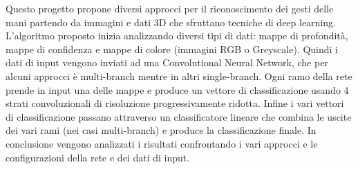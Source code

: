 
Questo progetto propone diversi approcci per il riconoscimento dei gesti delle mani partendo da immagini e dati 3D che sfruttano tecniche di deep learning. L'algoritmo proposto inizia analizzando diversi tipi di dati: mappe di profondità, mappe di confidenza e mappe di colore (immagini RGB o Greyscale). Quindi i dati di input vengono inviati ad una Convolutional Neural Network, che per alcuni approcci è multi-branch mentre in altri single-branch. Ogni ramo della rete prende in input una delle mappe e produce un vettore di classificazione usando 4 strati convoluzionali di risoluzione progressivamente ridotta. Infine i vari vettori di classificazione passano attraverso un classificatore lineare che combina le uscite dei vari rami (nei casi multi-branch) e produce la classificazione finale.
In conclusione vengono analizzati i risultati confrontando i vari approcci e le configurazioni della rete e dei dati di input. 